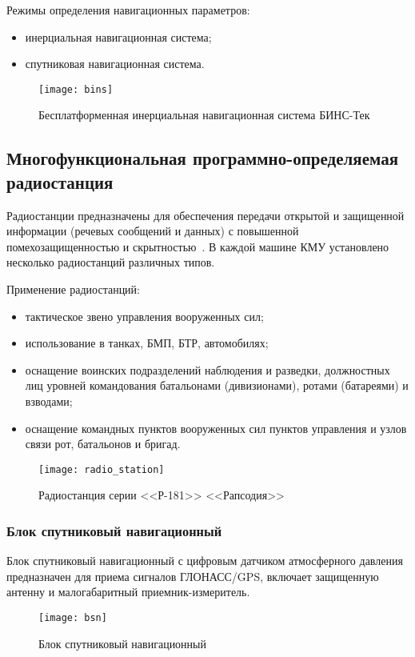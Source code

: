 Режимы определения навигационных параметров:
\begin{itemize}
	\item инерциальная навигационная система;
	\item спутниковая навигационная система.
\end{itemize}
\begin{figure}[ht]
	\centering
	\texttt{[image: bins]}
	\caption{Бесплатформенная инерциальная навигационная система БИНС-Тек~\cite{bins}}
	\label{fig:lit_reiview:ins:bins}
\end{figure}

\subsection{Многофункциональная программно-определяемая радиостанция}
\label{sub:lit_review:radio}

Радиостанции предназначены для обеспечения передачи открытой и защищенной информации (речевых сообщений и данных) с
повышенной помехозащищенностью и скрытностью~\cite{prc9661}.
В каждой машине КМУ установлено несколько радиостанций различных типов.

Применение радиостанций:
\begin{itemize}
	\item тактическое звено управления вооруженных сил;
	\item использование в танках, БМП, БТР, автомобилях;
	\item оснащение воинских подразделений наблюдения и разведки, должностных лиц уровней командования батальонами
		(дивизионами), ротами (батареями) и взводами;
	\item оснащение командных пунктов вооруженных сил пунктов управления и узлов связи рот, батальонов и бригад.
\end{itemize}

\begin{figure}[htb]
	\centering
	\texttt{[image: radio\_station]}
	\caption{Радиостанция серии <<Р-181>> <<Рапсодия>>~\cite{prc9661}}
	\label{fig:lit_reiview:meteo:radio_station}
\end{figure}

\subsubsection{Блок спутниковый навигационный}
\label{sub:lit_review:ins:bsn}
Блок спутниковый навигационный с цифровым датчиком атмосферного давления предназначен для приема сигналов ГЛОНАСС/GPS, включает защищенную антенну и малогабаритный приемник-измеритель.
\begin{figure}
	\centering
	\texttt{[image: bsn]}
	\caption{Блок спутниковый навигационный~\cite{bsn}}
	\label{fig:lit_reiview:ins:bsn}
\end{figure}

